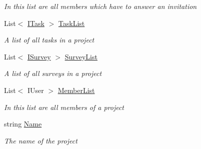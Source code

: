 \begin{DoxyCompactItemize}
\begin{DoxyCompactList}\small\item\em In this list are all members which have to answer an invitation \end{DoxyCompactList}\item 
List$<$ \hyperlink{interface_plex_byte_1_1_mo_cap_1_1_interactions_1_1_i_task}{I\+Task} $>$ \hyperlink{class_plex_byte_1_1_mo_cap_1_1_interactions_1_1_project_ab55a7377ee7124ba1af72ac486db8953}{Task\+List}
\begin{DoxyCompactList}\small\item\em A list of all tasks in a project \end{DoxyCompactList}\item 
List$<$ \hyperlink{interface_plex_byte_1_1_mo_cap_1_1_interactions_1_1_i_survey}{I\+Survey} $>$ \hyperlink{class_plex_byte_1_1_mo_cap_1_1_interactions_1_1_project_aeafe2719337840a5afb37d431db20639}{Survey\+List}
\begin{DoxyCompactList}\small\item\em A list of all surveys in a project \end{DoxyCompactList}\item 
List$<$ I\+User $>$ \hyperlink{class_plex_byte_1_1_mo_cap_1_1_interactions_1_1_project_a2b3c3d78367b1ca4f4a4ae87e3b444ab}{Member\+List}
\begin{DoxyCompactList}\small\item\em In this list are all members of a project \end{DoxyCompactList}\item 
string \hyperlink{class_plex_byte_1_1_mo_cap_1_1_interactions_1_1_project_aa6a59b416e07515e6d8799f410157488}{Name}
\begin{DoxyCompactList}\small\item\em The name of the project \end{DoxyCompactList}\end{DoxyCompactItemize}
